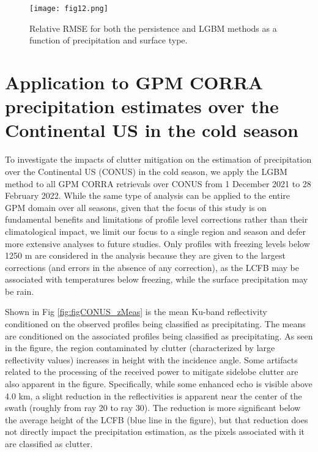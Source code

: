 \documentclass{ametsocV6.1} %
\begin{document}
\begin{figure}
\begin{center}
\texttt{[image: fig12.png]}
\caption{Relative RMSE for both the persistence and LGBM methods as a function of precipitation and surface type.}
\label{fig:figRMSE}
\end{center}
\end{figure}

\section{Application to GPM CORRA precipitation estimates over the Continental US in the cold season}
To investigate the impacts of clutter mitigation on the estimation of precipitation over the Continental US (CONUS) in the cold season, we apply the LGBM method to all GPM CORRA retrievals over CONUS from 1 December 2021 to 28 February 2022. While the same type of analysis can be applied to the entire GPM domain over all seasons, given that the focus of this study is on fundamental benefits and limitations of profile level corrections rather than their climatological impact, we limit our focus to a single region and season and defer more extensive analyses to future studies. Only profiles with freezing levels below 1250 m are considered in the analysis because they are given to the largest corrections (and errors in the absence of any correction), as the LCFB may be associated with temperatures below freezing, while the surface precipitation may be rain.

Shown in Fig \ref{fig:figCONUS_zMeas} is the mean Ku-band reflectivity conditioned on the observed profiles being classified as precipitating. The means are conditioned on the associated profiles being classified as precipitating. As seen in the figure, the region contaminated by clutter (characterized by large reflectivity values) increases in height with the incidence angle. Some artifacts related to the processing of the received power to mitigate sidelobe clutter \citep{kubota2016} are also apparent in the figure.  Specifically, while some enhanced echo is visible above 4.0 km, a slight reduction in the reflectivities is apparent near the center of the swath (roughly from ray 20 to ray 30).  The reduction is more significant below the average height of the LCFB (blue line in the figure), but that reduction does not directly impact the precipitation estimation, as the pixels associated with it are classified as clutter. 
\end{document}
